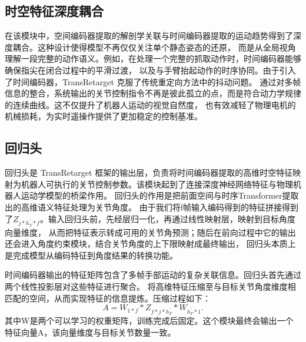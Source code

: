 \subsection{时空特征深度耦合}
在该模块中，空间编码器提取的解剖学关联与时间编码器提取的运动趋势得到了深度耦合。这种设计使得模型不再仅仅关注单个静态姿态的还原，
而是从全局视角理解一段完整的动作语义。例如，在处理一个完整的抓取动作时，时间编码器能够确保指尖在闭合过程中的平滑过渡，
以及与手臂抬起动作的时序协同。由于引入了时间编码器，TransRetarget 克服了传统重定向方法中的抖动问题。
通过对多帧信息的整合，系统输出的关节控制指令不再是彼此孤立的点，而是符合动力学规律的连续曲线。这不仅提升了机器人运动的视觉自然度，
也有效减轻了物理电机的机械损耗，为实时遥操作提供了更加稳定的控制基准。

\subsection{回归头}
回归头是 TransRetarget 框架的输出层，负责将时间编码器提取的高维时空特征映射为机器人可执行的关节控制参数。该模块起到了连接深度神经网络特征与物理机器人运动学模型的桥梁作用。
回归头的作用是把前面空间与时序Transformer提取出的高维语义特征处理为关节角度。
由于我们将f帧输入编码得到的特征拼接得到了$Z_{j*h^{'}_{T}*f}$。输入回归头前，先经层归一化，再通过线性映射层，映射到目标角度向量维度，
从而把特征表示转成可用的关节角预测；随后在前向过程中它的输出还会进入角度约束模块，结合关节角度的上下限映射成最终输出，
回归头本质上是完成模型从编码特征到角度结果的转换功能。

时间编码器输出的特征矩阵包含了多帧手部运动的复杂关联信息。回归头首先通过两个线性投影层对这些特征进行聚合。
将高维特征压缩至与目标关节角度维度相匹配的空间，从而实现特征的信息提炼。压缩过程如下：
\begin{equation}
A = W_{1*f} * Z_{f*j*h^{'}_{T}} * W_{h^{'}_{T}*1}.
\end{equation}
其中W是两个可以学习的权重矩阵，训练完成后固定。这个模块最终会输出一个特征向量A，该向量维度与目标关节数量一致。

